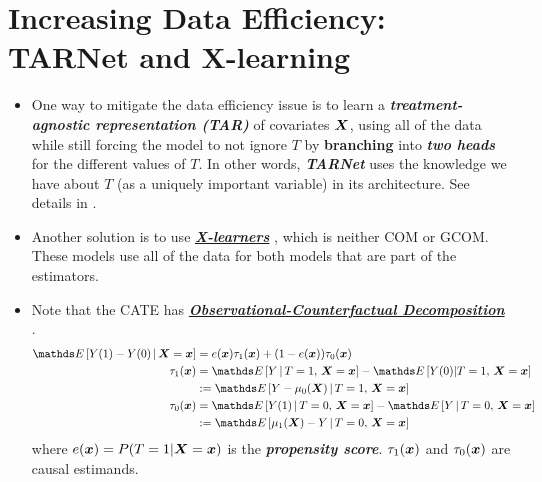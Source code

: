 \documentclass[11pt]{article}
\begin{document}
\section{Increasing Data Efficiency: TARNet and X-learning}
\begin{itemize}
\item One way to mitigate the data efficiency issue is to learn a \textbf{\emph{treatment-agnostic representation (TAR)}} of covariates $\boldsymbol{X}$, using all of the data while still forcing the model to not ignore $T$ by \textbf{branching} into \emph{\textbf{two heads}} for the different values of $T$.  In other words, \emph{\textbf{TARNet}} \citep{shalit2017estimating} uses the knowledge we have about $T$ (as a uniquely important variable) in its architecture.  See details in \citep{neal2020introduction}.

\item Another solution is to use \underline{\emph{\textbf{X-learners}}} \citep{kunzel2019metalearners, neal2020introduction}, which is neither COM or GCOM. These models use all of the data for both models that are part of the estimators.

\item Note that the CATE has \underline{\emph{\textbf{Observational-Counterfactual Decomposition}}} \citep{neal2020introduction}.
\begin{align}
\E{}{Y(1) - Y(0)\,|\,\mb{X} = \mb{x}} &= e(\mb{x}) \tau_1(\mb{x}) +(1-e(\mb{x}))\tau_0(\mb{x})  \nonumber \\
 \tau_1(\mb{x}) &= \E{}{Y\,| \, T=1,\,\mb{X} = \mb{x}} - \E{}{Y(0) | T=1,\,\mb{X} = \mb{x}} \label{eqn: x_learner_iate_1} \\
 &:= \E{}{Y - \mu_0(\mb{X})\,|\,T=1, \, \mb{X}=\mb{x}} \nonumber\\
  \tau_0(\mb{x}) &=\E{}{Y(1) \,|\, T=0,\,\mb{X} = \mb{x}}  - \E{}{Y \,|\, T=0,\,\mb{X} = \mb{x}}\label{eqn: x_learner_iate_0} \\
 &:=  \E{}{\mu_1(\mb{X}) - Y\,|\,T=0,\,\mb{X} = \mb{x}} \nonumber
\end{align} where $e(\boldsymbol{x}) = P(T=1 | \boldsymbol{X}=\boldsymbol{x})$ is the \emph{\textbf{propensity score}}. $\tau_1(\boldsymbol{x})$ and $\tau_0(\boldsymbol{x})$ are causal estimands.


\end{itemize}
\end{document}
